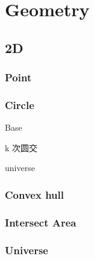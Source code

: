\section{Geometry}

\subsection{2D}

\subsubsection{Point}


\subsubsection{Circle}
Base

k 次圆交

universe


\subsubsection{Convex hull}


\subsubsection{Intersect Area}


\subsubsection{Universe}

